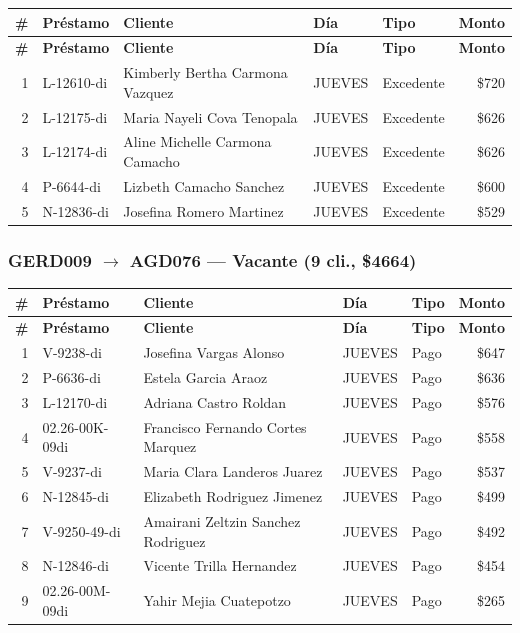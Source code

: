 \documentclass[11pt,a4paper]{article}
\newcommand{\money}[1]{\$\num{#1}}
\begin{document}
\begin{center}
\renewcommand{\arraystretch}{1.1}
\footnotesize
\begin{longtable}{rlp{5.5cm}llr}
\toprule
\textbf{\#} & \textbf{Pr\'estamo} & \textbf{Cliente} & \textbf{D\'ia} & \textbf{Tipo} & \textbf{Monto} \\
\midrule
\endfirsthead
\toprule
\textbf{\#} & \textbf{Pr\'estamo} & \textbf{Cliente} & \textbf{D\'ia} & \textbf{Tipo} & \textbf{Monto} \\
\midrule
\endhead
1 & L-12610-di & Kimberly Bertha Carmona Vazquez & JUEVES & Excedente & \money{720} \\
2 & L-12175-di & Maria Nayeli Cova Tenopala & JUEVES & Excedente & \money{626} \\
3 & L-12174-di & Aline Michelle Carmona Camacho & JUEVES & Excedente & \money{626} \\
4 & P-6644-di & Lizbeth Camacho Sanchez & JUEVES & Excedente & \money{600} \\
5 & N-12836-di & Josefina Romero Martinez & JUEVES & Excedente & \money{529} \\

\bottomrule
\end{longtable}
\end{center}
\subsubsection{GERD009 $\rightarrow$ AGD076 --- Vacante (9 cli., \money{4664})}


\begin{center}
\renewcommand{\arraystretch}{1.1}
\footnotesize
\begin{longtable}{rlp{5.5cm}llr}
\toprule
\textbf{\#} & \textbf{Pr\'estamo} & \textbf{Cliente} & \textbf{D\'ia} & \textbf{Tipo} & \textbf{Monto} \\
\midrule
\endfirsthead
\toprule
\textbf{\#} & \textbf{Pr\'estamo} & \textbf{Cliente} & \textbf{D\'ia} & \textbf{Tipo} & \textbf{Monto} \\
\midrule
\endhead
1 & V-9238-di & Josefina Vargas Alonso & JUEVES & Pago & \money{647} \\
2 & P-6636-di & Estela Garcia Araoz & JUEVES & Pago & \money{636} \\
3 & L-12170-di & Adriana Castro Roldan & JUEVES & Pago & \money{576} \\
4 & 02.26-00K-09di & Francisco Fernando Cortes Marquez & JUEVES & Pago & \money{558} \\
5 & V-9237-di & Maria Clara Landeros Juarez & JUEVES & Pago & \money{537} \\
6 & N-12845-di & Elizabeth Rodriguez Jimenez & JUEVES & Pago & \money{499} \\
7 & V-9250-49-di & Amairani Zeltzin Sanchez Rodriguez & JUEVES & Pago & \money{492} \\
8 & N-12846-di & Vicente Trilla Hernandez & JUEVES & Pago & \money{454} \\
9 & 02.26-00M-09di & Yahir Mejia Cuatepotzo & JUEVES & Pago & \money{265} \\

\bottomrule
\end{longtable}
\end{center}
\end{document}
